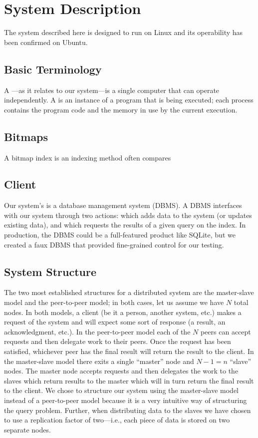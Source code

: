 \section{System Description}
The system described here is designed to run on Linux and its operability has been confirmed on Ubuntu.
%
\subsection{Basic Terminology}
A ---as it relates to our system---is a single computer that can operate independently.
A  is an instance of a program that is being executed; each process contains the program code and the memory in use by the current execution.
%
\subsection{Bitmaps}
A bitmap index is an indexing method often compares
%
\subsection{Client}
Our system's  is a database management system (DBMS).
A DBMS interfaces with our system through two actions:
 which adds data to the system (or updates existing data), and
 which requests the results of a given query on the index.
In production, the DBMS could be a full-featured product like SQLite, but we created a faux DBMS that provided fine-grained control for our testing.
%
\subsection{System Structure}
The two most established structures for a distributed system are the master-slave model and the peer-to-peer model; in both cases, let us assume we have \(N\) total nodes.
In both models, a client (be it a person, another system, etc.) makes a request of the system and will expect some sort of response (a result, an acknowledgment, etc.).
In the peer-to-peer model each of the \(N\) peers can accept requests and then delegate work to their peers.
Once the request has been satisfied, whichever peer has the final result will return the result to the client.
In the master-slave model there exits a single ``master'' node and \(N - 1 = n\) ``slave'' nodes.
The master node accepts requests and then delegates the work to the slaves which return results to the master which will in turn return the final result to the client.
We chose to structure our system using the master-slave model instead of a peer-to-peer model because it is a very intuitive way of structuring the query problem.
Further, when distributing data to the slaves we have chosen to use a replication factor of two---i.e., each piece of data is stored on two separate nodes.
%
